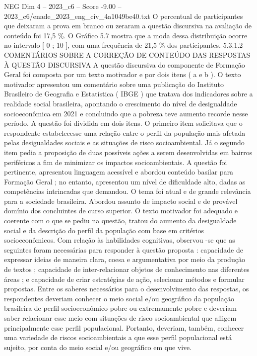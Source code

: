 \begin{textsample}{NEG Dim 4 – 2023\_c6 – Score -9.00 – 2023\_c6/enade\_2023\_eng\_civ\_4a1049be40.txt}
O percentual de participantes que deixaram a prova em branco ou zeraram a questão discursiva na avaliação de conteúdo foi 17,5 \%.
O Gráfico 5.7 mostra que a moda dessa distribuição ocorre no intervalo [ 0 ; 10 ], com uma frequência de 21,5 \% dos participantes. 5.3.1.2 COMENTÁRIOS SOBRE A CORREÇÃO DE CONTEÚDO DAS RESPOSTAS À QUESTÃO DISCURSIVA A questão discursiva do componente de Formação Geral foi composta por um texto motivador e por dois itens ( a e b ).
O texto motivador apresentou um comentário sobre uma publicação do Instituto Brasileiro de Geografia e Estatística ( IBGE ) que tratava dos indicadores sobre a realidade social brasileira, apontando o crescimento do nível de desigualdade socioeconômica em 2021 e concluindo que a pobreza teve aumento recorde nesse período.
A questão foi dividida em dois itens.
O primeiro item solicitava que o respondente estabelecesse uma relação entre o perfil da população mais afetada pelas desigualdades sociais e as situações de risco socioambiental.
Já o segundo item pedia a proposição de duas possíveis ações a serem desenvolvidas em bairros periféricos a fim de minimizar os impactos socioambientais.
A questão foi pertinente, apresentou linguagem acessível e abordou conteúdo basilar para Formação Geral ; no entanto, apresentou um nível de dificuldade alto, dadas as competências intrincadas que demandou.
O tema foi atual e de grande relevância para a sociedade brasileira.
Abordou assunto de impacto social e de provável domínio dos concluintes de curso superior.
O texto motivador foi adequado e coerente com o que se pediu na questão, tratou do aumento da desigualdade social e da descrição do perfil da população com base em critérios socioeconômicos.
Com relação às habilidades cognitivas, observou -se que as seguintes foram necessárias para responder à questão proposta : capacidade de expressar ideias de maneira clara, coesa e argumentativa por meio da produção de textos ; capacidade de inter-relacionar objetos de conhecimento nas diferentes áreas ; e capacidade de criar estratégias de ação, selecionar métodos e formular propostas.
Entre os saberes necessários para o desenvolvimento das respostas, os respondentes deveriam conhecer o meio social e/ou geográfico da população brasileira de perfil socioeconômico pobre ou extremamente pobre e deveriam saber relacionar esse meio com situações de risco socioambiental que afligem principalmente esse perfil populacional.
Portanto, deveriam, também, conhecer uma variedade de riscos socioambientais a que esse perfil populacional está sujeito, por conta do meio social e/ou geográfico em que vive.

\end{textsample}

